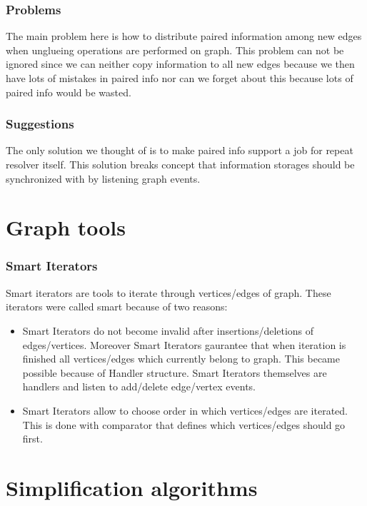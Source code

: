 \documentclass[12pt]{article}
\begin{document}
\subsubsection{Problems}

The main problem here is how to distribute paired information among new edges when unglueing operations are performed on graph. This problem can not be ignored since we can neither copy information to all new edges because we then have lots of mistakes in paired info nor can we forget about this because lots of paired info would be wasted.

\subsubsection{Suggestions}

The only solution we thought of is to make paired info support a job for repeat resolver itself. This solution breaks concept that information storages should be synchronized with by listening graph events.

\section{Graph tools}
\subsubsection{Smart Iterators}

Smart iterators are tools to iterate through vertices/edges of graph. These iterators were called smart because of two reasons:
\begin{itemize}
\item Smart Iterators do not become invalid after insertions/deletions of edges/vertices. Moreover Smart Iterators gaurantee that when iteration is finished all vertices/edges which currently belong to graph. This became possible because of Handler structure. Smart Iterators themselves are handlers and listen to add/delete edge/vertex events.
\item Smart Iterators allow to choose order in which vertices/edges are iterated. This is done with comparator that defines which vertices/edges should go first.
\end{itemize}

\section{Simplification algorithms}
\end{document}

